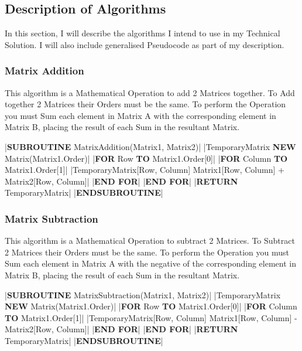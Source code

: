 \begin{flushleft}
        \subsection{Description of Algorithms}
            \large
            \vspace{0.2cm}
            In this section, I will describe the algorithms I intend to use in my Technical Solution. I will also include generalised
            Pseudocode as part of my description.

            \subsubsection{Matrix Addition}
                This algorithm is a Mathematical Operation to add 2 Matrices together. To Add together 2 Matrices their Orders
                must be the same. To perform the Operation you must Sum each element in Matrix A with the corresponding element 
                in Matrix B, placing the result of each Sum in the resultant Matrix.

                \vspace{0.2cm}
                \begin{pseudocode}
|\textbf{SUBROUTINE} MatrixAddition(Matrix1, Matrix2)|
    |TemporaryMatrix \leftarrow \textbf{NEW} Matrix(Matrix1.Order)|
    |\textbf{FOR} Row  \textbf{TO} Matrix1.Order[0]|
        |\textbf{FOR} Column  \textbf{TO} Matrix1.Order[1]|
            |TemporaryMatrix[Row, Column] \leftarrow Matrix1[Row, Column] + Matrix2[Row, Column]|
        |\textbf{END FOR}|
    |\textbf{END FOR}|
    |\textbf{RETURN} TemporaryMatrix|
|\textbf{ENDSUBROUTINE}|
                \end{pseudocode}

                \vspace{0.5cm}
            \subsubsection{Matrix Subtraction}
                This algorithm is a Mathematical Operation to subtract 2 Matrices. To Subtract 2 Matrices their Orders
                must be the same. To perform the Operation you must Sum each element in Matrix A with the negative of the 
                corresponding element in Matrix B, placing the result of each Sum in the resultant Matrix.

                \vspace{0.2cm}
                \begin{pseudocode}
|\textbf{SUBROUTINE} MatrixSubtraction(Matrix1, Matrix2)|
    |TemporaryMatrix \leftarrow \textbf{NEW} Matrix(Matrix1.Order)|
    |\textbf{FOR} Row  \textbf{TO} Matrix1.Order[0]|
        |\textbf{FOR} Column  \textbf{TO} Matrix1.Order[1]|
            |TemporaryMatrix[Row, Column] \leftarrow Matrix1[Row, Column] - Matrix2[Row, Column]|
        |\textbf{END FOR}|
    |\textbf{END FOR}|
    |\textbf{RETURN} TemporaryMatrix|
|\textbf{ENDSUBROUTINE}|
                \end{pseudocode}


\end{flushleft}

